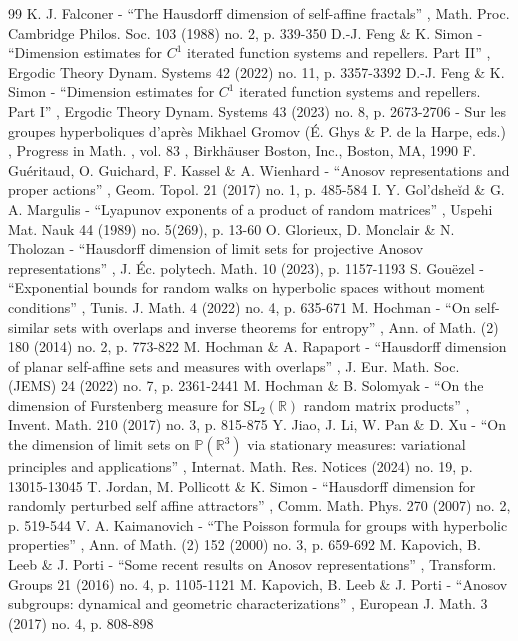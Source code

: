 \documentclass[10pt]{amsart}
\begin{document}
\begin{thebibliography}{99}
 K. J. Falconer - “The Hausdorff dimension of self-affine fractals” , Math. Proc. Cambridge Philos. Soc. 103 (1988) no. 2, p. 339-350
 D.-J. Feng \& K. Simon - “Dimension estimates for $C^1$ iterated function systems and repellers. Part II” , Ergodic Theory Dynam. Systems 42 (2022) no. 11, p. 3357-3392
 D.-J. Feng \& K. Simon - “Dimension estimates for $C^1$ iterated function systems and repellers. Part I” , Ergodic Theory Dynam. Systems 43 (2023) no. 8, p. 2673-2706
 - Sur les groupes hyperboliques d’après Mikhael Gromov (É. Ghys \& P. de la Harpe, eds.) , Progress in Math. , vol. 83 , Birkhäuser Boston, Inc., Boston, MA, 1990
 F. Guéritaud, O. Guichard, F. Kassel \& A. Wienhard - “Anosov representations and proper actions” , Geom. Topol. 21 (2017) no. 1, p. 485-584
 I. Y. Gol’dsheĭd \& G. A. Margulis - “Lyapunov exponents of a product of random matrices” , Uspehi Mat. Nauk 44 (1989) no. 5(269), p. 13-60
 O. Glorieux, D. Monclair \& N. Tholozan - “Hausdorff dimension of limit sets for projective Anosov representations” , J. Éc. polytech. Math. 10 (2023), p. 1157-1193
 S. Gouëzel - “Exponential bounds for random walks on hyperbolic spaces without moment conditions” , Tunis. J. Math. 4 (2022) no. 4, p. 635-671
 M. Hochman - “On self-similar sets with overlaps and inverse theorems for entropy” , Ann. of Math. (2) 180 (2014) no. 2, p. 773-822
 M. Hochman \& A. Rapaport - “Hausdorff dimension of planar self-affine sets and measures with overlaps” , J. Eur. Math. Soc. (JEMS) 24 (2022) no. 7, p. 2361-2441
 M. Hochman \& B. Solomyak - “On the dimension of Furstenberg measure for $\mathrm{SL}_2(\mathbb{R})$ random matrix products” , Invent. Math. 210 (2017) no. 3, p. 815-875
 Y. Jiao, J. Li, W. Pan \& D. Xu - “On the dimension of limit sets on $\mathbb{P} (\mathbb{R}^3)$ via stationary measures: variational principles and applications” , Internat. Math. Res. Notices (2024) no. 19, p. 13015-13045
 T. Jordan, M. Pollicott \& K. Simon - “Hausdorff dimension for randomly perturbed self affine attractors” , Comm. Math. Phys. 270 (2007) no. 2, p. 519-544
 V. A. Kaimanovich - “The Poisson formula for groups with hyperbolic properties” , Ann. of Math. (2) 152 (2000) no. 3, p. 659-692
 M. Kapovich, B. Leeb \& J. Porti - “Some recent results on Anosov representations” , Transform. Groups 21 (2016) no. 4, p. 1105-1121
 M. Kapovich, B. Leeb \& J. Porti - “Anosov subgroups: dynamical and geometric characterizations” , European J. Math. 3 (2017) no. 4, p. 808-898

\end{thebibliography}
\end{document}
